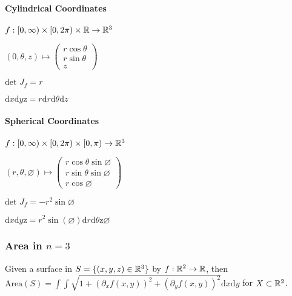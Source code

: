\paragraph{Cylindrical Coordinates}
\begin{compactitem}
    \item $f: [0, \infty) \times [0, 2 \pi) \times \mathbb{R} \to \mathbb{R}^3$
    \item $(0, \theta, z) \mapsto 
        \begin{pmatrix}
            r \cos \theta\\
            r \sin \theta\\
            z
        \end{pmatrix}$
    \item $\text{det }J_f = r$
    \item $\mathrm{d}x\mathrm{d}y\mathrm{z} = r\mathrm{d}r\mathrm{d}\theta\mathrm{d}z$
\end{compactitem}

\paragraph{Spherical Coordinates}
\begin{compactitem}
    \item $f: [0, \infty) \times [0, 2 \pi) \times [0, \pi) \to \mathbb{R}^3$
    \item $(r, \theta, \varnothing) \mapsto
        \begin{pmatrix}
            r \cos \theta \sin \varnothing\\
            r \sin \theta \sin \varnothing\\
            r \cos \varnothing
        \end{pmatrix}$
    \item $\text{det } J_f = -r^2 \sin \varnothing$
    \item $\mathrm{d}x\mathrm{d}y\mathrm{z} = r^2 \sin(\varnothing)\mathrm{d}r\mathrm{d}\theta\mathrm{z}\varnothing$
\end{compactitem}

\subsubsection{Area in $n = 3$}
Given a surface in $S = \{(x, y, z) \in \mathbb{R}^3\}$ by $f: \mathbb{R}^2 \to \mathbb{R}$, then $\text{Area}(S) = \int \int \sqrt{1 + (\partial_x f(x, y))^2 + (\partial_y f(x, y))^2} \mathrm{d}x\mathrm{d}y$ for $X \subset \mathbb{R}^2$.

